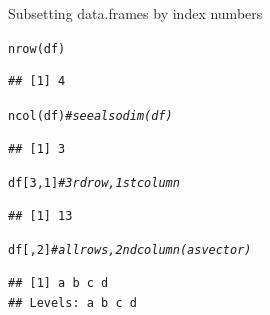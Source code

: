 \documentclass[xcolor=table,           xcolor=dvipsnames]{beamer}\usepackage[]{graphicx}\usepackage[]{color}
\makeatletter
\newcommand{\hlnum}[1]{\textcolor[rgb]{0,0,0}{#1}}
\newcommand{\hlcom}[1]{\textcolor[rgb]{0,0.392,0}{\textit{#1}}}
\newcommand{\hlstd}[1]{\textcolor[rgb]{0,0,0}{#1}}
\newcommand{\hlkwd}[1]{\textcolor[rgb]{0,0,1}{#1}}
\newenvironment{kframe}{%
 \def\at@end@of@kframe{}%
 \ifinner\ifhmode%
  \def\at@end@of@kframe{\end{minipage}}%
  \begin{minipage}{\columnwidth}%
 \fi\fi%
 \def\FrameCommand##1{\hskip\@totalleftmargin \hskip-\fboxsep
 \colorbox{shadecolor}{##1}\hskip-\fboxsep
     \hskip-\linewidth \hskip-\@totalleftmargin \hskip\columnwidth}%
 \MakeFramed {\advance\hsize-\width
   \@totalleftmargin\z@ \linewidth\hsize
   \@setminipage}}%
 {\par\unskip\endMakeFramed%
 \at@end@of@kframe}
\newenvironment{knitrout}{}{} %
\makeatother
\begin{document}

\begin{frame}[fragile]{Subsetting data.frames by index numbers}
\begin{knitrout}\small
{}\color{fgcolor}\begin{kframe}
\begin{alltt}
\hlkwd{nrow}\hlstd{(df)}
\end{alltt}
\begin{verbatim}
## [1] 4
\end{verbatim}
\begin{alltt}
\hlkwd{ncol}\hlstd{(df)} \hlcom{# see also dim(df)}
\end{alltt}
\begin{verbatim}
## [1] 3
\end{verbatim}
\end{kframe}
\end{knitrout}
\begin{knitrout}\small
{}\color{fgcolor}\begin{kframe}
\begin{alltt}
\hlstd{df[} \hlnum{3} \hlstd{,} \hlnum{1}\hlstd{]} \hlcom{# 3rd row, 1st column}
\end{alltt}
\begin{verbatim}
## [1] 13
\end{verbatim}
\begin{alltt}
\hlstd{df[   ,} \hlnum{2}\hlstd{]} \hlcom{# all rows, 2nd column (as vector)}
\end{alltt}
\begin{verbatim}
## [1] a b c d
## Levels: a b c d
\end{verbatim}
\end{kframe}
\end{knitrout}
\end{frame}

\end{document}
